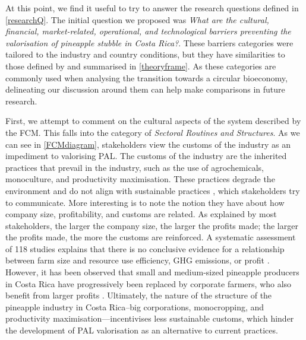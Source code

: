 At this point, we find it useful to try to answer the research questions defined in \cref{researchQ}. The initial question we proposed was
\textit{What are the cultural, financial, market-related, operational, and technological barriers preventing the valorisation of pineapple stubble in Costa Rica?}. These barriers categories were tailored to the industry and country conditions, but they have similarities to those defined by \cite{gottinger2020studying} and summarised in \cref{theoryframe}. As these categories are commonly used when analysing the transition towards a circular bioeconomy, delineating our discussion around them can help make comparisons in future research. 

First, we attempt to comment on the cultural aspects of the system described by the FCM. This falls into the category of \textit{Sectoral Routines and Structures}. As we can see in \cref{FCMdiagram}, stakeholders view the customs of the industry as an impediment to valorising PAL. The customs of the industry are the inherited practices that prevail in the industry, such as the use of agrochemicals, monoculture, and productivity maximisation. These practices degrade the environment and do not align with sustainable practices \citep{magdoff2000hungry}, which stakeholders try to communicate. More interesting is to note the notion they have about how company size, profitability, and customs are related. As explained by most stakeholders, the larger the company size, the larger the profits made; the larger the profits made, the more the customs are reinforced. A systematic assessment of 118 studies explains that there is no conclusive evidence for a relationship between farm size and resource use efficiency, GHG emissions, or profit \citep{ricciardi2021higher}. However, it has been observed that small and medium-sized pineapple producers in Costa Rica have progressively been replaced by corporate farmers, who also benefit from larger profits \citep{rodriguez2020extractivismo}. Ultimately, the nature of the structure of the pineapple industry in Costa Rica--big corporations, monocropping, and productivity maximisation---incentivises less sustainable customs, which hinder the development of PAL valorisation as an alternative to current practices. 


